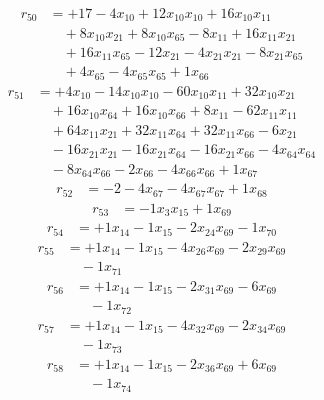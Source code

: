 \[\begin{aligned}
r_{50} &= + 17 - 4 x_{10} + 12 x_{10} x_{10} + 16 x_{10} x_{11} \\
 &\quad + 8 x_{10} x_{21} + 8 x_{10} x_{65} - 8 x_{11} + 16 x_{11} x_{21} \\
 &\quad + 16 x_{11} x_{65} - 12 x_{21} - 4 x_{21} x_{21} - 8 x_{21} x_{65} \\
 &\quad + 4 x_{65} - 4 x_{65} x_{65} + 1 x_{66}
\end{aligned}\]
\[\begin{aligned}
r_{51} &= + 4 x_{10} - 14 x_{10} x_{10} - 60 x_{10} x_{11} + 32 x_{10} x_{21} \\
 &\quad + 16 x_{10} x_{64} + 16 x_{10} x_{66} + 8 x_{11} - 62 x_{11} x_{11} \\
 &\quad + 64 x_{11} x_{21} + 32 x_{11} x_{64} + 32 x_{11} x_{66} - 6 x_{21} \\
 &\quad - 16 x_{21} x_{21} - 16 x_{21} x_{64} - 16 x_{21} x_{66} - 4 x_{64} x_{64} \\
 &\quad - 8 x_{64} x_{66} - 2 x_{66} - 4 x_{66} x_{66} + 1 x_{67}
\end{aligned}\]
\[\begin{aligned}
r_{52} &= - 2 - 4 x_{67} - 4 x_{67} x_{67} + 1 x_{68}
\end{aligned}\]
\[\begin{aligned}
r_{53} &= - 1 x_{3} x_{15} + 1 x_{69}
\end{aligned}\]
\[\begin{aligned}
r_{54} &= + 1 x_{14} - 1 x_{15} - 2 x_{24} x_{69} - 1 x_{70}
\end{aligned}\]
\[\begin{aligned}
r_{55} &= + 1 x_{14} - 1 x_{15} - 4 x_{26} x_{69} - 2 x_{29} x_{69} \\
 &\quad - 1 x_{71}
\end{aligned}\]
\[\begin{aligned}
r_{56} &= + 1 x_{14} - 1 x_{15} - 2 x_{31} x_{69} - 6 x_{69} \\
 &\quad - 1 x_{72}
\end{aligned}\]
\[\begin{aligned}
r_{57} &= + 1 x_{14} - 1 x_{15} - 4 x_{32} x_{69} - 2 x_{34} x_{69} \\
 &\quad - 1 x_{73}
\end{aligned}\]
\[\begin{aligned}
r_{58} &= + 1 x_{14} - 1 x_{15} - 2 x_{36} x_{69} + 6 x_{69} \\
 &\quad - 1 x_{74}
\end{aligned}\]
